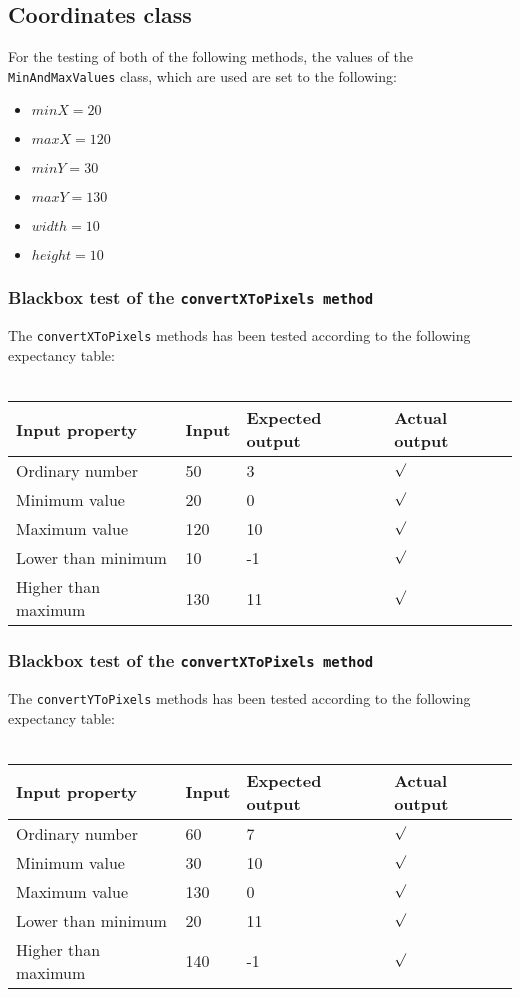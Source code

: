 \documentclass[a4paper,11pt]{article}
\begin{document}
\pagebreak
\subsection{Coordinates class}
For the testing of both of the following methods, the values of the \texttt{MinAndMaxValues} class, which are used are set to the following:
\begin{itemize}
	\item $minX = 20$
	\item $maxX = 120$
	\item $minY = 30$
	\item $maxY = 130$
	\item $width = 10$
	\item $height = 10$
\end{itemize}

\subsubsection{Blackbox test of the \texttt{convertXToPixels method}}
The \texttt{convertXToPixels} methods has been tested according to the following expectancy table: \\ \\
\begin{tabular}{ p{3.5cm} | p{2.5cm} | p{2.5cm} | p{2.5cm} }
	Input property & Input & Expected output & Actual output \\
	\hline
	Ordinary number & 50 & 3 & $\surd$ \\
	Minimum value & 20 & 0 & $\surd$ \\
	Maximum value & 120 & 10 & $\surd$ \\
	Lower than minimum & 10 & -1 & $\surd$ \\
	Higher than maximum & 130 & 11 & $\surd$
\end{tabular}

\subsubsection{Blackbox test of the \texttt{convertXToPixels method}}
The \texttt{convertYToPixels} methods has been tested according to the following expectancy table: \\ \\
\begin{tabular}{ p{3.5cm} | p{2.5cm} | p{2.5cm} | p{2.5cm} }
	Input property & Input & Expected output & Actual output \\
	\hline
	Ordinary number & 60 & 7 & $\surd$ \\
	Minimum value & 30 & 10 & $\surd$ \\
	Maximum value & 130 & 0 & $\surd$ \\
	Lower than minimum & 20 & 11 & $\surd$ \\
	Higher than maximum & 140 & -1 & $\surd$
\end{tabular}
\end{document}
